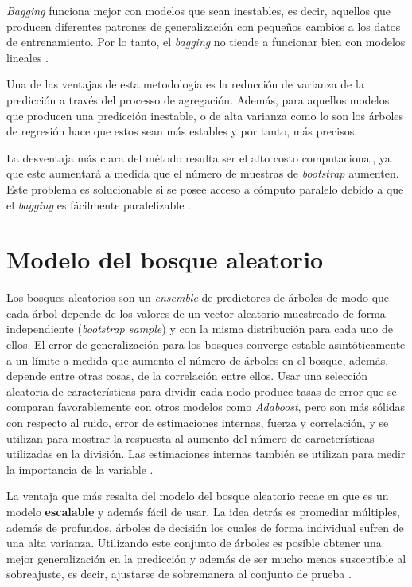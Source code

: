 \textit{Bagging} funciona mejor con modelos que sean inestables, es decir, aquellos que producen diferentes
patrones de generalización con pequeños cambios a los datos de entrenamiento. Por lo tanto, el \textit{bagging} no tiende a funcionar bien con modelos lineales \cite{19}.

Una de las ventajas de esta metodología es la reducción de varianza de la predicción a través del processo de agregación. Además, para aquellos modelos que producen una predicción inestable,
o de alta varianza como lo son los árboles de regresión hace que estos sean más estables \cite{18} y por tanto, más precisos.

La desventaja más clara del método resulta ser el alto costo computacional, ya que este aumentará a medida que el número de muestras
de \textit{bootstrap} aumenten. Este problema es solucionable si se posee acceso a cómputo paralelo debido a que el \textit{bagging} es fácilmente paralelizable \cite{18}.
%
%
%
%
\section{Modelo del bosque aleatorio}
Los bosques aleatorios son un \textit{ensemble} de predictores de árboles de modo que cada árbol depende de los valores de un vector aleatorio muestreado de forma independiente (\textit{bootstrap sample}) y con la misma distribución para cada uno de ellos. 
El error de generalización para los bosques converge estable asintóticamente a un límite a medida que aumenta el número de árboles en el bosque, además, depende entre otras cosas, de la correlación entre ellos. Usar una selección aleatoria de características para dividir cada nodo produce
tasas de error que se comparan favorablemente con otros modelos como \textit{Adaboost}, pero son más sólidas con respecto al ruido, error de estimaciones internas,
fuerza y correlación, y se utilizan para mostrar la respuesta al aumento del número de características utilizadas
en la división. Las estimaciones internas también se utilizan para medir la importancia de la variable \cite{25}.

La ventaja que más resalta del modelo del bosque aleatorio recae en que es un modelo \textbf{escalable} y además fácil de usar. La idea detrás es promediar múltiples, además de profundos, 
árboles de decisión los cuales de forma individual sufren de una alta varianza. Utilizando este conjunto de árboles es posible obtener una mejor generalización en la predicción y además de ser mucho menos
susceptible al sobreajuste, es decir, ajustarse de sobremanera al conjunto de prueba \cite{24}.

